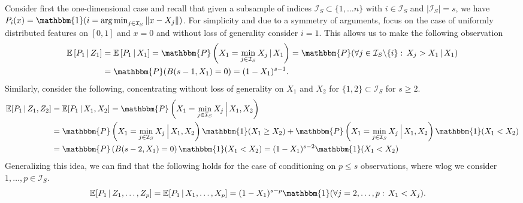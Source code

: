 \documentclass[letterpaper,10pt]{article}
\numberwithin{equation}{section}
\numberwithin{thm}{section}
\numberwithin{lem}{section}
\numberwithin{cor}{section}
\newcommand{\E}{\mathbb{E}}
\newcommand{\1}{\mathbb{1}}
\renewcommand{\P}{\mathbbm{P}}
\DeclareMathOperator*{\argmin}{arg\,min} %
\begin{document}
Consider first the one-dimensional case and recall that given a subsample of indices $\mathcal{I}_S \subset \{1, \dotsc n\}$ with $i \in \mathcal{I}_S$ and $|\mathcal{I}_S| = s$, we have $P_i(x) = \mathbbm{1}(i = \argmin_{j \in \mathcal{I}_S} \|x - X_{j}\|)$.
For simplicity and due to a symmetry of arguments, focus on the case of uniformly distributed features on $[0,1]$ and $x = 0$ and without loss of generality consider $i = 1$.
This allows us to make the following observation
\begin{equation*}
	\begin{aligned}
		\E\left[P_1 \, | \, Z_1\right]
		 & = \E\left[P_1 \, | \, X_1\right]
		= \P\left(X_1 = \min_{j \in \mathcal{I}_S} X_j \, | \, X_1\right)
		= \P(\forall j \in \mathcal{I}_S \backslash \{i\}: \, X_j > X_1 \, | \, X_1) \\
		 & = \P(B(s-1, X_1) = 0)
		= (1-X_1)^{s-1}.
	\end{aligned}
\end{equation*}
Similarly, consider the following, concentrating without loss of generality on $X_1$ and $X_2$ for $\{1,2\} \subset \mathcal{I}_S$ for $s \geq 2$.
\begin{equation*}
	\begin{aligned}
		\E[P_1 \, | \, Z_1, Z_2]
		 & = \E[P_1 \, | \, X_1, X_2]
		= \P\left(X_1 = \min_{j \in \mathcal{I}_S} X_j \, \Big| \, X_1, X_2\right)                              \\
		 & = \P\left(X_1 = \min_{j \in \mathcal{I}_S} X_j \, \Big| \, X_1, X_2\right) \mathbbm{1}(X_1 \geq X_2)
		+ \P\left(X_1 = \min_{j \in \mathcal{I}_S} X_j \, \Big| \, X_1, X_2\right) \mathbbm{1}(X_1 < X_2)       \\
		 & = \P\left(B(s-2, X_1) = 0\right) \mathbbm{1}(X_1 < X_2)
		= (1 - X_1)^{s-2} \mathbbm{1}(X_1 < X_2)                                                                \\
	\end{aligned}
\end{equation*}
Generalizing this idea, we can find that the following holds for the case of conditioning on $p \leq s $ observations, where wlog we consider $1, \dotsc, p \in \mathcal{I}_S$.
\begin{equation*}
	\begin{aligned}
		\E[P_1 \, | \, Z_1, \dotsc, Z_p]
		 & = \E[P_1 \, | \, X_1, \dotsc, X_p]
		= (1 - X_1)^{s-p} \mathbbm{1}(\forall j = 2, \dotsc, p: \, X_1 < X_j).
	\end{aligned}
\end{equation*}
\end{document}

